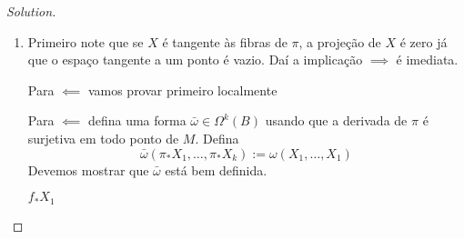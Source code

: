 \begin{proof}[Solution]\leavevmode
\begin{enumerate}[label=\alph*.]
	\item Primeiro note que se $X$ é tangente às fibras de $\pi$, a projeção de $X$ é zero já que o espaço tangente a um ponto é vazio. Daí a implicação $\implies $ é imediata.

	Para $\impliedby$ vamos provar primeiro localmente


	Para  $\impliedby$ defina uma forma $\bar{\omega}\in\Omega^{k}(B)$ usando que a derivada de $\pi$ é surjetiva em todo ponto de $M$. Defina
	\[\bar{\omega}(\pi_*X_1,\ldots,\pi_*X_k):=\omega(X_1,\ldots,X_1)\]
Devemos mostrar que $\bar{\omega}$ está bem definida.

\begin{idea1}{$f_*X_1$}\leavevmode

\end{idea1}
\end{enumerate}	
\end{proof}


